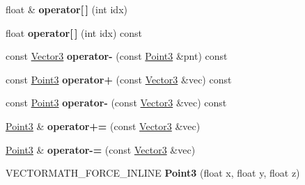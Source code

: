 \begin{DoxyCompactItemize}
\mbox{\label{classVectormath_1_1Aos_1_1Point3_a555b835162f7daa0d6f942cadf2a0936}} 
float \& {\bfseries operator\mbox{[}$\,$\mbox{]}} (int idx)
\item 
\mbox{\label{classVectormath_1_1Aos_1_1Point3_addac25a83948a427c21675fa8a4d2b54}} 
float {\bfseries operator\mbox{[}$\,$\mbox{]}} (int idx) const
\item 
\mbox{\label{classVectormath_1_1Aos_1_1Point3_a4e433d5db0dab90d2e941a6981f97730}} 
const \hyperlink{classVectormath_1_1Aos_1_1Vector3}{Vector3} {\bfseries operator-\/} (const \hyperlink{classVectormath_1_1Aos_1_1Point3}{Point3} \&pnt) const
\item 
\mbox{\label{classVectormath_1_1Aos_1_1Point3_a23ae6fabbd3330bf220915f8184ffd35}} 
const \hyperlink{classVectormath_1_1Aos_1_1Point3}{Point3} {\bfseries operator+} (const \hyperlink{classVectormath_1_1Aos_1_1Vector3}{Vector3} \&vec) const
\item 
\mbox{\label{classVectormath_1_1Aos_1_1Point3_ace39ea5ea8e3ef62bed449a31e679ffb}} 
const \hyperlink{classVectormath_1_1Aos_1_1Point3}{Point3} {\bfseries operator-\/} (const \hyperlink{classVectormath_1_1Aos_1_1Vector3}{Vector3} \&vec) const
\item 
\mbox{\label{classVectormath_1_1Aos_1_1Point3_a4f7f61200e8ced36d7fb661af52d8222}} 
\hyperlink{classVectormath_1_1Aos_1_1Point3}{Point3} \& {\bfseries operator+=} (const \hyperlink{classVectormath_1_1Aos_1_1Vector3}{Vector3} \&vec)
\item 
\mbox{\label{classVectormath_1_1Aos_1_1Point3_a804c9086101d647919f3600d9a61d4d4}} 
\hyperlink{classVectormath_1_1Aos_1_1Point3}{Point3} \& {\bfseries operator-\/=} (const \hyperlink{classVectormath_1_1Aos_1_1Vector3}{Vector3} \&vec)
\item 
\mbox{\label{classVectormath_1_1Aos_1_1Point3_a52cee9c70e6d12d50c89d1206d06ceb0}} 
V\+E\+C\+T\+O\+R\+M\+A\+T\+H\+\_\+\+F\+O\+R\+C\+E\+\_\+\+I\+N\+L\+I\+NE {\bfseries Point3} (float x, float y, float z)

\end{DoxyCompactItemize}
